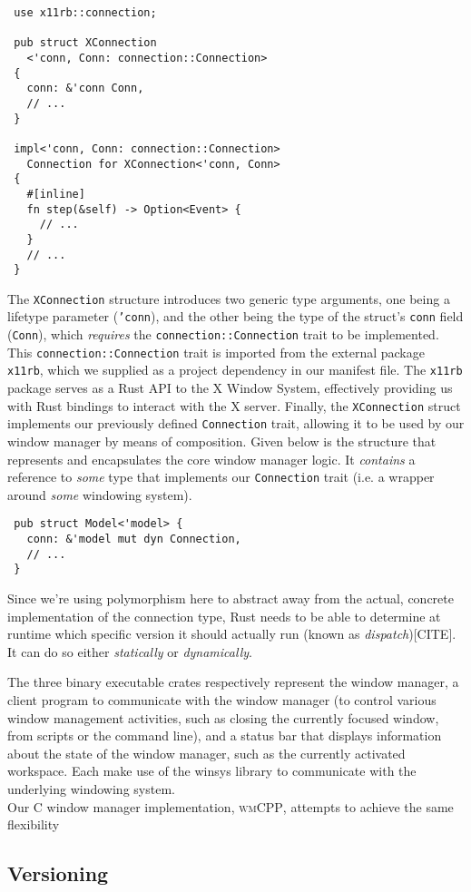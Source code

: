 \begin{verbatim}
 use x11rb::connection;

 pub struct XConnection
   <'conn, Conn: connection::Connection>
 {
   conn: &'conn Conn,
   // ...
 }

 impl<'conn, Conn: connection::Connection>
   Connection for XConnection<'conn, Conn>
 {
   #[inline]
   fn step(&self) -> Option<Event> {
     // ...
   }
   // ...
 }
\end{verbatim}

The  \texttt{XConnection}  structure  introduces  two  generic  type  arguments,
one  being   a  lifetype  parameter   (\texttt{'conn}),  and  the   other  being
the   type  of   the   struct's  \texttt{conn}   field  (\texttt{Conn}),   which
\textit{requires} the  \texttt{connection::Connection} trait to  be implemented.
This \texttt{connection::Connection} trait is imported from the external package
\texttt{x11rb}, which we supplied as a  project dependency in our manifest file.
The  \texttt{x11rb}  package serves  as  a  Rust API  to  the  X Window  System,
effectively  providing us  with Rust  bindings to  interact with  the X  server.
Finally,  the  \texttt{XConnection}  struct implements  our  previously  defined
\texttt{Connection} trait, allowing it to be used by our window manager by means
of composition.  Given below is  the structure that represents  and encapsulates
the core window manager logic. It \textit{contains} a reference to \textit{some}
type  that  implements our  \texttt{Connection}  trait  (i.e. a  wrapper  around
\textit{some} windowing system).

\begin{verbatim}
 pub struct Model<'model> {
   conn: &'model mut dyn Connection,
   // ...
 }
\end{verbatim}


Since  we're  using  polymorphism  here   to  abstract  away  from  the  actual,
concrete  implementation of  the  connection  type, Rust  needs  to  be able  to
determine  at runtime  which  specific  version it  should  actually run  (known
as  \textit{dispatch})[CITE].  It  can   do  so  either  \textit{statically}  or
\textit{dynamically}.


The three binary executable crates  respectively represent the window manager, a
client program to communicate with the window manager (to control various window
management  activities,  such as  closing  the  currently focused  window,  from
scripts or the  command line), and a status bar  that displays information about
the state of the window manager, such as the currently activated workspace. Each
make use  of the  winsys library  to communicate  with the  underlying windowing
system.\\

Our  C\text{++}  window  manager  implementation,  \textsc{wmCPP},  attempts  to
achieve the same flexibility

\subsection{Versioning}
{ \textcolor{gray}\blindtext }
